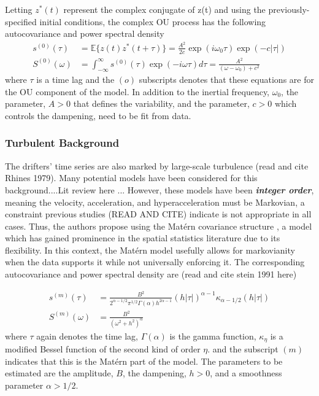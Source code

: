 \documentclass{stat572Style}
\begin{document}
Letting $z^{*}(t)$ represent the complex conjugate of z(t) and using the previously-specified initial conditions, the complex OU process has the following  autocovariance  and power spectral density
\begin{align}
\label{eq:ouAC}
s^{(0)}(\tau) &= \mathbb{E}\{z(t)z^{*}(t + \tau) \} = \frac{A^{2}}{2c} \exp(i \omega_{0}\tau) \exp(-c|\tau|)\\
\label{eq:ouPSD}
S^{(0)}(\omega) &= \int_{-\infty}^{\infty} s^{(0)}(\tau) \exp (-i \omega \tau) d \tau = \frac{A^{2}}{(\omega - \omega_{0}) + c^{2}}
\end{align}
where $\tau$ is a time lag and the $(o)$ subscripts denotes that these equations are for the OU component of the model.  In addition to the inertial frequency, $\omega_{0}$, the parameter, $A > 0$ that defines the variability, and the parameter, $c >0$ which controls the dampening,  need to be fit from data. 
\subsubsection{Turbulent Background}
The drifters' time series are also marked by large-scale turbulence (read and cite Rhines 1979). Many potential models have been considered for this background....Lit review here ... However, these models have been \textbf{\it{integer order}}, meaning the velocity, acceleration, and hyperacceleration must be Markovian, a constraint previous studies (READ AND CITE) indicate is not appropriate in all cases. Thus, the authors propose using the Mat\'{e}rn covariance structure \citep{Gneiting2012}, a model which has gained prominence in the spatial statistics literature due to its flexibility. In this context, the Mat\'{e}rn model usefully  allows for markovianity when the data supports it while not universally enforcing it. The corresponding autocovariance and power spectral density are (read and cite stein 1991 here)

\begin{align}
\label{eq:maternAC}
s^{(m)}(\tau) &= \frac{B^{2}}{2^{\alpha - 1/2}\pi^{1/2} \Gamma(\alpha) h^{2 \alpha - 1}}(h|\tau|)^{\alpha - 1}\kappa_{\alpha - 1/2}(h|\tau|)\\
\label{eq:maternPSD}
S^{(m)}(\omega) &= \frac{B^{2}}{(\omega^{2} + h^{2})^{\alpha}}
\end{align}
where $\tau$ again denotes the time lag, $\Gamma(\alpha)$ is the gamma function,  $\kappa_{\eta}$ is a modified Bessel function of the second kind of order $\eta$. and the subscript $(m)$ indicates that this is the Mat\'{e}rn part of the model. The parameters to be estimated are the amplitude, $B$, the dampening, $h > 0$, and a smoothness parameter $\alpha > 1/2$. 
\end{document}
